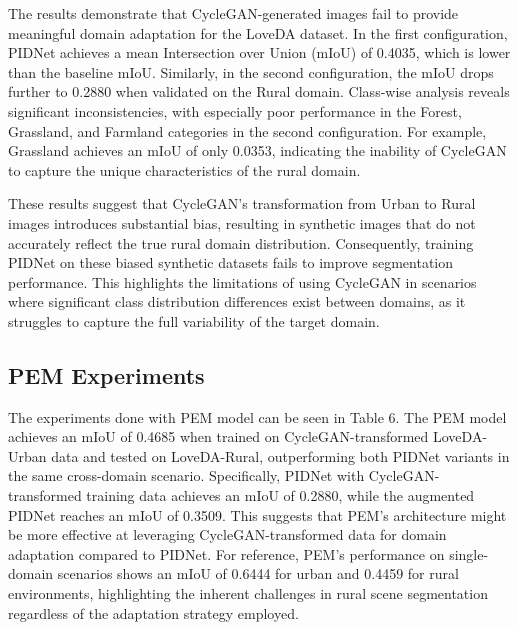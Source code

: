 \documentclass[10pt,twocolumn,letterpaper]{article}
\begin{document}
The results demonstrate that CycleGAN-generated images fail to provide meaningful domain adaptation for the LoveDA dataset. In the first configuration, PIDNet achieves a mean Intersection over Union (mIoU) of 0.4035, which is lower than the baseline mIoU. Similarly, in the second configuration, the mIoU drops further to 0.2880 when validated on the Rural domain. Class-wise analysis reveals significant inconsistencies, with especially poor performance in the Forest, Grassland, and Farmland categories in the second configuration. For example, Grassland achieves an mIoU of only 0.0353, indicating the inability of CycleGAN to capture the unique characteristics of the rural domain. 

These results suggest that CycleGAN's transformation from Urban to Rural images introduces substantial bias, resulting in synthetic images that do not accurately reflect the true rural domain distribution. Consequently, training PIDNet on these biased synthetic datasets fails to improve segmentation performance. This highlights the limitations of using CycleGAN in scenarios where significant class distribution differences exist between domains, as it struggles to capture the full variability of the target domain.




\subsection{PEM Experiments}
The experiments done with PEM model can be seen in Table 6. The PEM model achieves an mIoU of 0.4685 when trained on CycleGAN-transformed LoveDA-Urban data and tested on LoveDA-Rural, outperforming both PIDNet variants in the same cross-domain scenario. Specifically, PIDNet with CycleGAN-transformed training data achieves an mIoU of 0.2880, while the augmented PIDNet reaches an mIoU of 0.3509. This suggests that PEM's architecture might be more effective at leveraging CycleGAN-transformed data for domain adaptation compared to PIDNet. For reference, PEM's performance on single-domain scenarios shows an mIoU of 0.6444 for urban and 0.4459 for rural environments, highlighting the inherent challenges in rural scene segmentation regardless of the adaptation strategy employed.

\begin{table}[H]
\centering
{}
\caption{Performance of PEM Model with Different Training and Test Sets}
\end{table}
\end{document}
